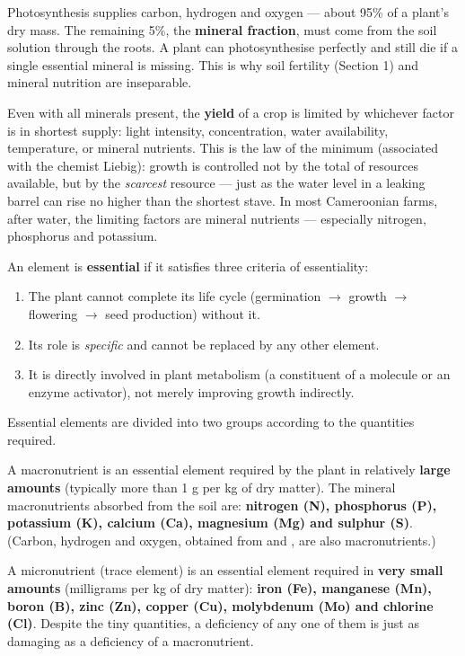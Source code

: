 \documentclass[11pt]{article}
\newcommand{\cle}[1]{{\popxbold\color{popdark}#1}}
\newcounter{popsec}
\newcounter{popsub}
\newcommand{\courssub}[1]{%
  \stepcounter{popsub}%
  \par\vspace{9pt}\noindent{\popxbold\fontsize{11.5}{13}\selectfont\color{popink}{\color{poporange}\thepopsec.\thepopsub}\hspace{6pt}#1}\par\nopagebreak\vspace{4pt}
}
\begin{document}
\begin{attention}
Photosynthesis supplies carbon, hydrogen and oxygen --- about 95\% of a plant's dry mass. The remaining 5\%, the \textbf{mineral fraction}, must come from the soil solution through the roots. A plant can photosynthesise perfectly and still die if a single essential mineral is missing. This is why soil fertility (Section 1) and mineral nutrition are inseparable.
\end{attention}

Even with all minerals present, the \textbf{yield} of a crop is limited by whichever factor is in shortest supply: light intensity,  concentration, water availability, temperature, or mineral nutrients. This is the \cle{law of the minimum} (associated with the chemist Liebig): growth is controlled not by the total of resources available, but by the \emph{scarcest} resource --- just as the water level in a leaking barrel can rise no higher than the shortest stave. In most Cameroonian farms, after water, the limiting factors are mineral nutrients --- especially nitrogen, phosphorus and potassium.

\courssub{Essential Mineral Elements}

An element is \textbf{essential} if it satisfies three \cle{criteria of essentiality}:
\begin{enumerate}
\item The plant cannot complete its life cycle (germination $\rightarrow$ growth $\rightarrow$ flowering $\rightarrow$ seed production) without it.
\item Its role is \emph{specific} and cannot be replaced by any other element.
\item It is directly involved in plant metabolism (a constituent of a molecule or an enzyme activator), not merely improving growth indirectly.
\end{enumerate}

Essential elements are divided into two groups according to the quantities required.

\begin{definition}
A \cle{macronutrient} is an essential element required by the plant in relatively \textbf{large amounts} (typically more than 1 g per kg of dry matter). The mineral macronutrients absorbed from the soil are: \textbf{nitrogen (N), phosphorus (P), potassium (K), calcium (Ca), magnesium (Mg) and sulphur (S)}. (Carbon, hydrogen and oxygen, obtained from  and , are also macronutrients.)

A \cle{micronutrient} (trace element) is an essential element required in \textbf{very small amounts} (milligrams per kg of dry matter): \textbf{iron (Fe), manganese (Mn), boron (B), zinc (Zn), copper (Cu), molybdenum (Mo) and chlorine (Cl)}. Despite the tiny quantities, a deficiency of any one of them is just as damaging as a deficiency of a macronutrient.
\end{definition}
\end{document}
